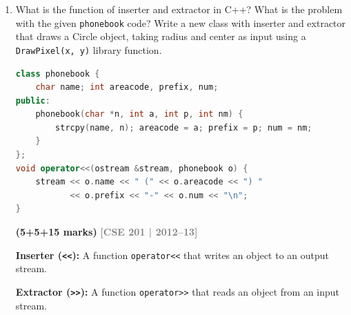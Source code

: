 \documentclass[12pt,a3paper]{article}
\newcommand{\yr}[1]{\hfill\textcolor{gray}{\small\textbf{[#1]}}}
\newcommand{\mk}[1]{\textcolor{orange!70!black}{\small\textbf{(#1 marks)}}}
\begin{document}
\begin{enumerate}
\begin{tcolorbox}[enhanced,breakable,ansbox,colback=cA!4,colframe=cA,
  boxrule=0.8pt,arc=5pt,
  title={\textbf{Answer --- Formatted output for A, B, S}},
  fonttitle=\bfseries\color{white},colbacktitle=cA]
\begin{lstlisting}[language=C++]
int main(){
    int    A = 10;
    double B = 123.234567;
    string S = "hello";

    // Line 1: hello %%%%%hello hello%%%%%
    cout << left  << setw(5)  << setfill('%') << S;   // hello
    cout << right << setw(10) << setfill('%') << S;   // %%%%%hello
    cout << " ";
    cout << left  << setw(10) << setfill('%') << S;   // hello%%%%%
    cout << "\n";

    // Line 2: 123.234567  123.235%%%
    cout << setfill(' ') << left;
    cout << setw(12) << setprecision(9) << fixed << B;   // 123.234567
    cout << setfill('%') << setw(10) << setprecision(3) << fixed << B; // 123.235%%%
    cout << "\n";

    return 0;
}
\end{lstlisting}

\end{tcolorbox}


\item What is the function of inserter and extractor in C++? What is the problem with the given \texttt{phonebook} code? Write a new class with inserter and extractor that draws a Circle object, taking radius and center as input using a \texttt{DrawPixel(x, y)} library function.
\begin{lstlisting}[language=C++]
class phonebook {
    char name; int areacode, prefix, num;
public:
    phonebook(char *n, int a, int p, int nm) {
        strcpy(name, n); areacode = a; prefix = p; num = nm;
    }
};
void operator<<(ostream &stream, phonebook o) {
    stream << o.name << " (" << o.areacode << ") "
           << o.prefix << "-" << o.num << "\n";
}
\end{lstlisting}
\mk{5+5+15}
\yr{CSE 201 | 2012--13}

\begin{tcolorbox}[enhanced,breakable,ansbox,colback=cA!4,colframe=cA,
  boxrule=0.8pt,arc=5pt,
  title={\textbf{Answer --- Inserter/extractor; phonebook problems; Circle inserter/extractor}},
  fonttitle=\bfseries\color{white},colbacktitle=cA]

\textbf{Inserter (\texttt{<<}):} A function \texttt{operator<<}
that writes an object to an output stream.

\textbf{Extractor (\texttt{>>}):} A function \texttt{operator>>}
that reads an object from an input stream.


\end{tcolorbox}
\end{enumerate}
\end{document}
